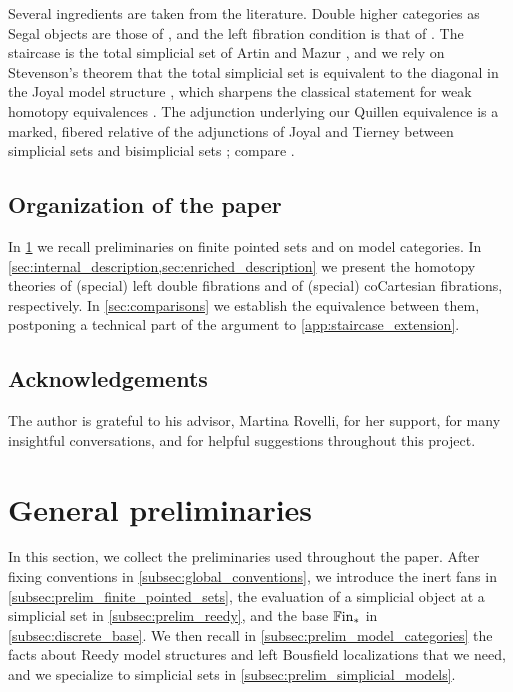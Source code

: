 \documentclass[10pt,reqno]{amsart}
\begin{document}
Several ingredients are taken from the literature. Double higher
categories as Segal objects are those of \cite{Moser2026InftyN}, and
the left fibration condition is that of \cite{Rasekh2021Yoneda}. The
staircase is the total simplicial set of Artin and Mazur
\cite{ArtinMazur1966VanKampen}, and we rely on
Stevenson's theorem that the total simplicial set is equivalent to the
diagonal in the Joyal model structure
\cite{Stevenson2025TotalSimplicialSet}, which sharpens the classical
statement for weak homotopy equivalences \cite{CegarraRemedios2005}.
The adjunction underlying our Quillen equivalence is a marked, fibered
relative of the adjunctions of Joyal and Tierney between simplicial
sets and bisimplicial sets \cite{JoyalTierney2007}; compare
\cite{Rasekh2021QuasiCategories}.

\subsection*{Organization of the paper}
In \cref{sec:general_preliminaries} we recall preliminaries on finite
pointed sets and on model categories. In
\cref{sec:internal_description,sec:enriched_description} we present the
homotopy theories of (special) left double fibrations and of (special)
coCartesian fibrations, respectively. In \cref{sec:comparisons} we
establish the equivalence between them, postponing a technical part of
the argument to \cref{app:staircase_extension}.

\subsection*{Acknowledgements}
The author is grateful to his advisor, Martina Rovelli, for her support, for many insightful conversations, and for helpful suggestions throughout this project.


\section{General preliminaries}
\label{sec:general_preliminaries}

In this section, we collect the preliminaries used throughout the
paper. After fixing conventions in \cref{subsec:global_conventions}, we
introduce the inert fans in \cref{subsec:prelim_finite_pointed_sets},
the evaluation of a simplicial object at a simplicial set in
\cref{subsec:prelim_reedy}, and the base $\mathbb{F}\mathrm{in}_*$ in
\cref{subsec:discrete_base}. We then recall in
\cref{subsec:prelim_model_categories} the facts about Reedy model
structures and left Bousfield localizations that we need, and we
specialize to simplicial sets in
\cref{subsec:prelim_simplicial_models}.
\end{document}
